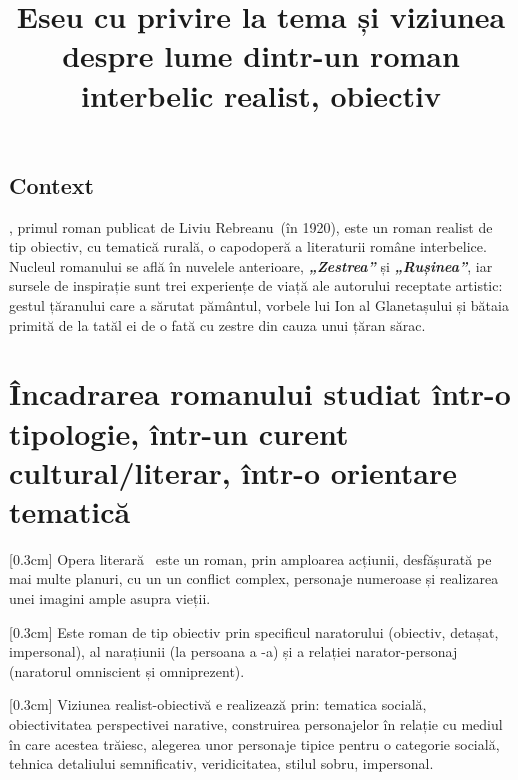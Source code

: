 


\newcommand{\operatitle}{\textbfit{„Ion”}} %
\newcommand{\operaauthor}{Liviu Rebreanu} %

\title{Eseu cu privire la tema și viziunea despre lume dintr-un roman interbelic realist, obiectiv}



\maketitle %



\subsection{Context}

\operatitle, primul roman publicat de \operaauthor\ (în 1920), este un roman realist de tip obiectiv, cu tematică rurală, o capodoperă a literaturii române interbelice. Nucleul romanului se află în nuvelele anterioare, \textbf{\textit{„Zestrea”}} și \textbf{\textit{„Rușinea”}}, iar sursele de inspirație sunt trei experiențe de viață ale autorului receptate artistic: gestul țăranului care a sărutat pământul, vorbele lui Ion al Glanetașului și bătaia primită de la tatăl ei de o fată cu zestre din cauza unui țăran sărac.


\section{Încadrarea romanului studiat într-o tipologie, într-un curent cultural/literar, într-o orientare tematică}

[0.3cm]
Opera literară \operatitle\ este un roman, prin amploarea acțiunii, desfășurată pe mai multe planuri, cu un un conflict complex, personaje numeroase și realizarea unei imagini ample asupra vieții.

[0.3cm]
Este roman de tip obiectiv prin specificul naratorului (obiectiv, detașat, impersonal), al narațiunii (la persoana a -a) și a relației narator-personaj (naratorul omniscient și omniprezent).

[0.3cm]
Viziunea realist-obiectivă e realizează prin: tematica socială, obiectivitatea perspectivei narative, construirea personajelor în relație cu mediul în care acestea trăiesc, alegerea unor personaje tipice pentru o categorie socială, tehnica detaliului semnificativ, veridicitatea, stilul sobru, impersonal.


